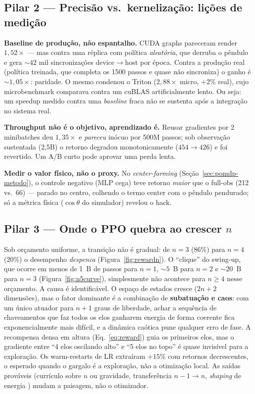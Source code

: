 \documentclass[12pt]{article}
\begin{document}
\subsection{Pilar 2 --- Precisão vs.\ kernelização: lições de medição}
\label{sec:analise-medicao}

\textbf{Baseline de produção, não espantalho.}\label{sec:graph} CUDA graphs
pareceram render $1{,}52\times$ --- mas contra uma réplica com política
\emph{aleatória}, que derruba o pêndulo e gera ${\sim}42$ mil sincronizações
device$\to$host por época. Contra a produção real (política treinada, que
completa os 1500 passos e quase não sincroniza) o ganho é ${\sim}1{,}05\times$:
paridade. O mesmo condenou o Triton ($2{,}88\times$ micro, $+2\%$ real), cujo
microbenchmark comparava contra um cuBLAS artificialmente lento. Ou seja: um
speedup medido contra uma \emph{baseline} fraca não se sustenta após a
integração no sistema real.

\textbf{Throughput não é o objetivo, aprendizado é.}\label{sec:staleness}
Reusar gradientes por 2 minibatches deu $1{,}35\times$ e \emph{pareceu} inócuo
por 500M passos; sob observação sustentada (2,5B) o retorno degradou
monotonicamente ($454 \to 426$) e foi revertido. Um A/B curto pode aprovar uma
perda lenta.

\textbf{Medir o valor físico, não o proxy.} No \emph{center-farming}
(Seção~\ref{sec:pomdp-metodo}), o controle negativo (MLP cega) teve retorno
\emph{maior} que o full-obs (212 vs.\ 66) --- parado no centro, colhendo o
termo $\mathrm{center}$ com o pêndulo pendurado; só a métrica física
($\cos\theta$ do simulador) revelou o hack.

\subsection{Pilar 3 --- Onde o PPO quebra ao crescer $n$}
\label{sec:analise-quebra}

Sob orçamento uniforme, a transição não é gradual: de $n{=}3$ (86\%) para
$n{=}4$ (20\%) o desempenho \emph{despenca} (Figura~\ref{fig:rewardn}). O
``clique'' do swing-up, que ocorre em menos de 1~B de passos para $n{=}1$,
${\sim}5$~B para $n{=}2$ e ${\sim}20$~B para $n{=}3$
(Figura~\ref{fig:n5curve}), simplesmente não acontece para $n \geq 4$ nesse
orçamento. A causa é identificável. O espaço de estados cresce ($2n+2$
dimensões), mas o fator dominante é a combinação de \textbf{subatuação e
caos}: com um único
atuador para $n{+}1$ graus de liberdade, achar a sequência de chaveamentos que
faz todos os elos ganharem energia de forma coerente fica exponencialmente mais
difícil, e a dinâmica caótica pune qualquer erro de fase. A recompensa densa em
altura (Eq.~\ref{eq:reward}) guia os primeiros elos, mas o gradiente entre ``4
elos oscilando alto'' e ``5 elos no topo'' é quase invisível para a exploração.
Os warm-restarts de LR extraíram $+15\%$ com retornos decrescentes, o esperado
quando o gargalo é a exploração, não a otimização local. As saídas prováveis
(currículo sobre $n$ ou gravidade, transferência $n{-}1 \to n$, \emph{shaping}
de energia \cite{astrom2000}) mudam a paisagem, não o otimizador.
\end{document}

